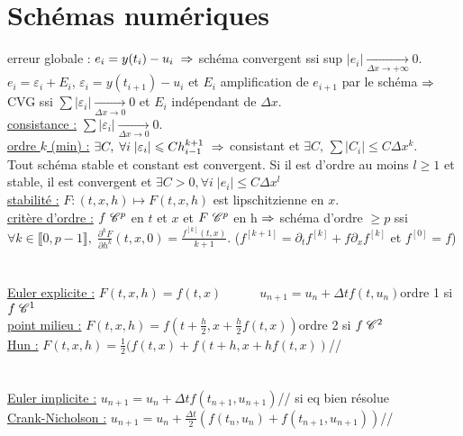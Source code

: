 \documentclass[12 pt]{book}
\begin{document}
\section*{Schémas numériques}
erreur globale : $e_i = y(t_i) -u_i \; \Rightarrow$ schéma convergent ssi sup $|e_i| \underset{\Delta x\to +\infty}{\longrightarrow}0$.\\
$e_i = \varepsilon_i + E_i$, $\varepsilon_i =y(t_{i+1}) - u_i$ et $E_i$ amplification de $e_{i+1}$ par le schéma $\Rightarrow$ CVG ssi $\sum |\varepsilon_i| \underset{\Delta x\to 0}{\longrightarrow}0$ et $ E_i$ indépendant de $\Delta x$.\\
\underline{consistance :} $\sum |\varepsilon_i| \underset{\Delta x\to 0}{\longrightarrow} 0$.\\
\underline{ordre $k$ (min) :} $\exists C, \; \forall i \; |\varepsilon_i| \leqslant C h_{i-1}^{k+1} \ \Rightarrow$ consistant et $\exists C, \, \sum |C_i| \leqslant C \Delta x^k$.\\
Tout schéma stable et constant est convergent. Si il est d'ordre au moins $l\geqslant 1$ et stable, il est convergent et $\exists C>0,  \forall i \; |e_i|\leqslant C \Delta x^l$\\
\underline{stabilité :} $F: (t,x,h) \mapsto F(t,x,h)$ est lipschitzienne en $x$.\\
\underline{critère d'ordre :} $f \ \mathscr{C}^p$ en $t$ et $x$ et $F \ \mathscr{C}^p$ en h $\Rightarrow$ schéma d'ordre $\geqslant p$ ssi\\ $\forall k\in \llbracket0,p-1\rrbracket, \; \frac{\partial^k F}{\partial h^k}(t,x,0) = \frac{f^{[k]}(t,x)}{k+1}$. \qquad \quad ($f^{[k+1]} = \partial_t f^{[k]} + f\partial_x f^{[k]}$ et $f^{[0]}=f$)\\
\text{}\\
\text{}\\
\underline{Euler explicite :} $F(t,x,h) =f(t,x) \qquad \quad u_{n+1} = u_n + \Delta t f(t,u_n)$\qquad  ordre 1 si $f\; \mathscr{C}^1$\\
\underline{point milieu :} $F(t,x,h) = f(t+\frac{h}{2}, x+\frac{h}{2}f(t,x))$\qquad  ordre 2 si $f \; \mathscr{C}^2$\\
\underline{Hun :} $F(t,x,h) = \frac{1}{2} (f(t,x) + f(t+h,x+hf(t,x))$\qquad  //\\
\text{}\\
\text{}\\
\underline{Euler implicite :} $u_{n+1} = u_n + \Delta tf(t_{n+1},u_{n+1})$\qquad  // si eq bien résolue\\
\underline{Crank-Nicholson :} $u_{n+1} = u_n + \frac{\Delta t}{2}(f(t_n,u_n) + f(t_{n+1},u_{n+1}))$\qquad  //\\
\end{document}
